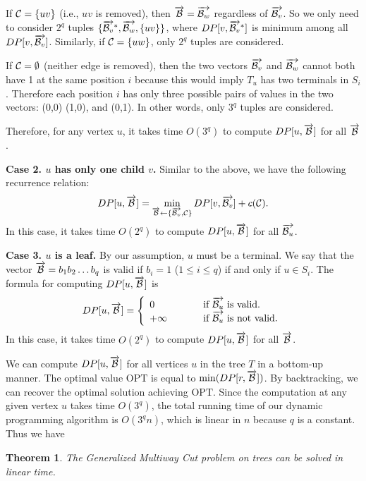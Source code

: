 \documentclass[11pt]{article}
\newtheorem{theorem}{Theorem}[section]
\begin{document}
If ${\cal C} = \{uv\}$ (i.e., $uv$ is removed), then $\overrightarrow{{\cal B}} = \overrightarrow{{\cal B}_{w}}$ regardless of $\overrightarrow{{\cal B}_{v}}$. So we only need to consider $2^q$ tuples $\{\overrightarrow{{\cal B}_{v}}^*, \overrightarrow{{\cal B}_{w}}, \{uv\}\}$, where $DP[v, \overrightarrow{{\cal B}_{v}}^*]$ is minimum among all $DP[v, \overrightarrow{{\cal B}_{v}}]$. Similarly, if ${\cal C} = \{uw\}$, only $2^q$ tuples are considered.

If ${\cal C} = \emptyset$ (neither edge is removed), then the two vectors $\overrightarrow{{\cal B}_{v}}$ and $\overrightarrow{{\cal B}_{w}}$ cannot both have 1 at the same position $i$ because this would imply $T_u$ has two terminals in $S_i$. Therefore each position $i$ has only three possible pairs of values in the two vectors: (0,0) (1,0), and (0,1). In other words, only $3^q$ tuples are considered.

Therefore, for any vertex $u$, it takes time $O(3^q)$ to compute $DP[u, \overrightarrow{{\cal B}}]$ for all $\overrightarrow{{\cal B}}$.

{\bf Case 2. $u$ has only one child $v$.} Similar to the above, we have the following recurrence relation:
$$DP[u, \overrightarrow{{\cal B}}] = \min_{\overrightarrow{{\cal B}} \leftarrow \{\overrightarrow{{\cal B}_{v}}, {\cal C}\}} DP[v, \overrightarrow{{\cal B}_{v}}] + c({\cal C}).$$
In this case, it takes time $O(2^q)$ to compute $DP[u, \overrightarrow{{\cal B}}]$ for all $\overrightarrow{{\cal B}_u}$.

{\bf Case 3. $u$ is a leaf.} By our assumption, $u$ must be a terminal. We say that the vector $\overrightarrow{{\cal B}} = b_1b_2\ldots b_q$ is valid if $b_i = 1$ ($1 \leq i \leq q$) if and only if $u \in S_i$.
The formula for computing $DP[u, \overrightarrow{{\cal B}}]$ is
\begin{displaymath}
DP[u, \overrightarrow{{\cal B}}]
= \left\{
\begin{array}{ll}
0 & ~~~~~~~~\mbox{if $\overrightarrow{{\cal B}_u}$ is valid.}\\
+\infty & ~~~~~~~~\mbox{if $\overrightarrow{{\cal B}_u}$ is not valid.}
\end{array}
\right.
\end{displaymath}
In this case, it takes time $O(2^q)$ to compute $DP[u, \overrightarrow{{\cal B}}]$ for all $\overrightarrow{{\cal B}}$.


We can compute $DP[u, \overrightarrow{{\cal B}}]$ for all vertices $u$ in the tree $T$ in a bottom-up manner.
The optimal value $\mathrm{OPT}$ is equal to
$\min(DP[r, \overrightarrow{{\cal B}}])$. By backtracking, we can recover the optimal solution achieving
$\mathrm{OPT}$. Since the computation at any given vertex $u$ takes time $O(3^q)$, the total running time of our dynamic programming algorithm is
$O(3^q n)$, which is linear in $n$ because $q$ is a constant.
Thus we have
\begin{theorem}
\label{th - GMWCT can be solved in linear time}
The Generalized Multiway Cut problem on trees can be solved in linear time.
\end{theorem}
\end{document}
